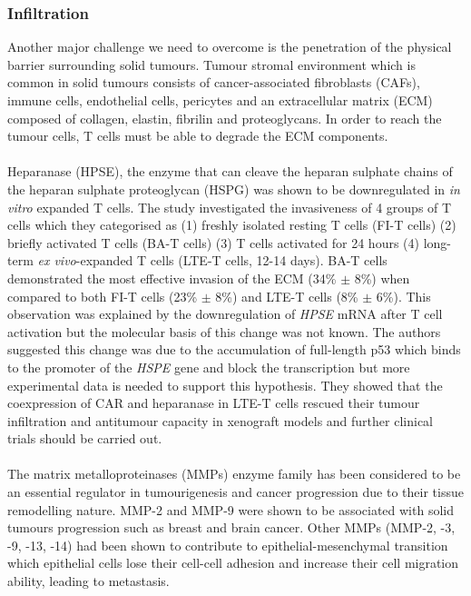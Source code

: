 \documentclass[12pt,oneside]{report}
\begin{document}
\subsubsection{Infiltration} 
Another major challenge we need to overcome is the penetration of the physical barrier surrounding solid tumours. Tumour stromal environment which is common in solid tumours consists of cancer-associated fibroblasts (CAFs), immune cells, endothelial cells, pericytes and an extracellular matrix (ECM) composed of collagen, elastin, fibrilin and proteoglycans\citep{heparanase}. In order to reach the tumour cells, T cells must be able to degrade the ECM components. 
\\\\Heparanase (HPSE), the enzyme that can cleave the heparan sulphate chains of the heparan sulphate proteoglycan (HSPG) was shown to be downregulated in \textit{in vitro} expanded T cells\citep{heparanase}. The study investigated the invasiveness of 4 groups of T cells which they categorised as (1) freshly isolated resting T cells (FI-T cells) (2) briefly activated T cells (BA-T cells) (3) T cells activated for 24 hours (4) long-term \textit{ex vivo}-expanded T cells (LTE-T cells, 12-14 days)\citep{heparanase}. BA-T cells demonstrated the most effective invasion of the ECM (34\% $\pm$ 8\%) when compared to both FI-T cells (23\% $\pm$ 8\%) and LTE-T cells (8\% $\pm$ 6\%)\citep{heparanase}. This observation was explained by the downregulation of \textit{HPSE} mRNA after T cell activation but the molecular basis of this change was not known. The authors suggested this change was due to the accumulation of full-length p53 which binds to the promoter of the \textit{HSPE} gene and block the transcription but more experimental data is needed to support this hypothesis. They showed that the coexpression of CAR and heparanase in LTE-T cells rescued their tumour infiltration and antitumour capacity in xenograft models\citep{heparanase} and further clinical trials should be carried out. 
\\\\The matrix metalloproteinases (MMPs) enzyme family has been considered to be an essential regulator in tumourigenesis and cancer progression due to their tissue remodelling nature. MMP-2 and MMP-9 were shown to be associated with solid tumours progression such as breast and brain cancer\citep{MMP2, MMP2-2, MMP9}. Other MMPs (MMP-2, -3, -9, -13, -14) had been shown to contribute to epithelial-mesenchymal transition which epithelial cells lose their cell-cell adhesion and increase their cell migration ability, leading to metastasis\citep{MMPs}. 
\end{document}

